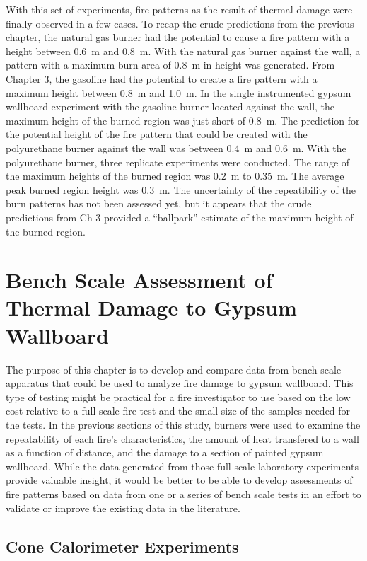 \documentclass[twoside]{uocthesis}
\begin{document}
{With this set of experiments, fire patterns as the result of thermal damage were finally observed in a few cases.  To recap the crude predictions from the previous chapter, the natural gas burner had the potential to cause a fire pattern with a height between 0.6~m and 0.8~m.  With the natural gas burner against the wall, a pattern with a maximum burn area of 0.8~m in height was generated.  From Chapter 3, the gasoline had the potential to create a fire pattern with a maximum height between 0.8~m and 1.0~m.  In the single instrumented gypsum wallboard experiment with the gasoline burner located against the wall, the maximum height of the burned region was just short of 0.8~m.  The prediction for the potential height of the fire pattern that could be created with the polyurethane burner against the wall was between 0.4~m and 0.6~m.  With the polyurethane burner, three replicate experiments were conducted.  The range of the maximum heights of the burned region was 0.2~m to 0.35~m.  The average peak burned region height was 0.3~m. The uncertainty of the repeatibility of the burn patterns has not been assessed yet, but it appears that the crude predictions from Ch 3 provided a ``ballpark'' estimate of the maximum height of the burned region.      


\chapter{Bench Scale Assessment of Thermal Damage to Gypsum Wallboard}

The purpose of this chapter is to develop and compare data from bench scale apparatus that could be used to analyze fire damage to gypsum wallboard.
This type of testing might be practical for a fire investigator to use based on the low cost relative to a full-scale fire test and the small size of the samples needed for the tests.  In the previous sections of this study, burners were used to examine the repeatability of each fire's characteristics, the amount of heat transfered to a wall as a function of distance, and the damage to a section of painted gypsum wallboard.  While the data generated from those full scale laboratory experiments provide valuable insight, it would be better to be able to develop assessments of fire patterns based on data from one or a series of bench scale tests in an effort to validate or improve the existing data in the literature.       


\section{Cone Calorimeter Experiments}

}
\end{document}
